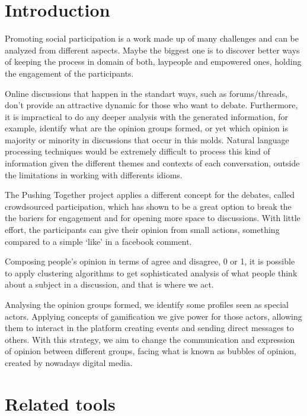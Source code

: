 \documentclass{llncs}
\begin{document}
\section{Introduction}
\label{sec:intro}
  Promoting social participation is a work made up of many challenges and can be
  analyzed from different aspects. Maybe the biggest one is to discover better
  ways of keeping the process in domain of both, laypeople and empowered ones,
  holding the engagement of the participants.

  Online discussions that happen in the standart ways, such as forums/threads, don’t
  provide an attractive dynamic for those who want to debate. Furthermore, it is
  impractical to do any deeper analysis with the generated information, for example,
  identify what are the opinion groups formed, or yet which opinion is majority
  or minority in discussions that occur in this molds. Natural language processing
  techniques would be extremely difficult to process this kind of information
  given the different themes and contexts of each conversation, outside the
  limitations in working with differents idioms.

  The Pushing Together project applies a different concept for the debates,
  called crowdsourced participation, which has shown to be a great option to break the
  the bariers for engagement and for opening more space to discussions. With little
  effort, the participants can give their opinion from small actions,
  something compared to a simple ‘like’ in a facebook comment.

  Composing people’s opinion in terms of agree and disagree, 0 or 1, it is possible
  to apply clustering algorithms to get sophisticated analysis of what people
  think about a subject in a discussion, and that is where we act.

  Analysing the opinion groups formed, we identify some profiles seen as special actors.
  Applying concepts of gamification we give power for those actors, allowing
  them to interact in the platform creating events and sending direct messages
  to others. With this strategy, we aim to change the communication and expression
  of opinion between different groups, facing what is known as bubbles of opinion,
  created by nowadays digital media.  


\section{Related tools}
\end{document}
